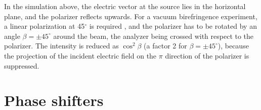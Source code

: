 \documentclass{iucr}
\begin{document}
In the simulation above, the electric vector at the source lies in the horizontal plane, and the polarizer reflects upwards.
For a vacuum birefringence experiment, a linear polarization at 45$^\circ$ is required \cite{Shen2018}, and the polarizer has to be rotated by an angle $\beta=\pm45^\circ$ around the beam, the analyzer being crossed with respect to the polarizer.
The intensity is reduced as $\cos^2\beta$ (a factor 2 for $\beta=\pm45^\circ$), because the projection of the incident electric field on the $\pi$ direction of the polarizer is suppressed.

\section{Phase shifters}\label{sec:phaseshifters_all}
\end{document}
